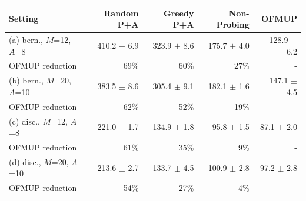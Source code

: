 \begin{tabular}{lrrrr}
\toprule
Setting & Random P+A & Greedy P+A & Non-Probing & OFMUP \\
\midrule
(a) bern., $M$=12, $A$=8 & 410.2 $\pm$ 6.9 & 323.9 $\pm$ 8.6 & 175.7 $\pm$ 4.0 & 128.9 $\pm$ 6.2 \\
\quad OFMUP reduction & 69\% & 60\% & 27\% & - \\
(b) bern., $M$=20, $A$=10 & 383.5 $\pm$ 8.6 & 305.4 $\pm$ 9.1 & 182.1 $\pm$ 1.6 & 147.1 $\pm$ 4.5 \\
\quad OFMUP reduction & 62\% & 52\% & 19\% & - \\
(c) disc., $M$=12, $A$=8 & 221.0 $\pm$ 1.7 & 134.9 $\pm$ 1.8 & 95.8 $\pm$ 1.5 & 87.1 $\pm$ 2.0 \\
\quad OFMUP reduction & 61\% & 35\% & 9\% & - \\
(d) disc., $M$=20, $A$=10 & 213.6 $\pm$ 2.7 & 133.7 $\pm$ 4.5 & 100.9 $\pm$ 2.8 & 97.2 $\pm$ 2.8 \\
\quad OFMUP reduction & 54\% & 27\% & 4\% & - \\
\bottomrule
\end{tabular}
